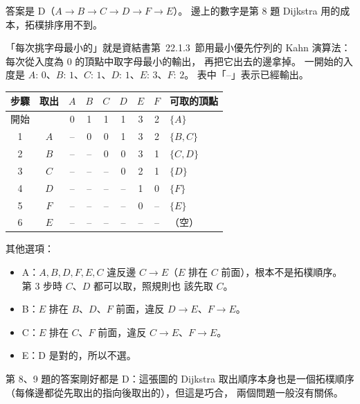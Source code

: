 \begin{pastsoln}
答案是 D（$A \to B \to C \to D \to F \to E$）。 邊上的數字是第 8 題 Dijkstra 用的成本，拓樸排序用不到。

「每次挑字母最小的」就是資結書第~22.1.3~節用最小優先佇列的 Kahn 演算法：每次從入度為 $0$ 的頂點中取字母最小的輸出，
再把它出去的邊拿掉。 一開始的入度是 $A{:}\,0$、$B{:}\,1$、$C{:}\,1$、$D{:}\,1$、$E{:}\,3$、$F{:}\,2$。 表中「--」表示已經輸出。
\begin{center}
\small
\begin{tabular}{cc*{6}{c}l}
\toprule
步驟 & 取出 & $A$ & $B$ & $C$ & $D$ & $E$ & $F$ & 可取的頂點 \\
\midrule
開始 & & 0 & 1 & 1 & 1 & 3 & 2 & $\{A\}$ \\
1 & $A$ & -- & 0 & 0 & 1 & 3 & 2 & $\{B, C\}$ \\
2 & $B$ & -- & -- & 0 & 0 & 3 & 1 & $\{C, D\}$ \\
3 & $C$ & -- & -- & -- & 0 & 2 & 1 & $\{D\}$ \\
4 & $D$ & -- & -- & -- & -- & 1 & 0 & $\{F\}$ \\
5 & $F$ & -- & -- & -- & -- & 0 & -- & $\{E\}$ \\
6 & $E$ & -- & -- & -- & -- & -- & -- & （空） \\
\bottomrule
\end{tabular}
\end{center}

其他選項：
\begin{itemize}
\item A：$A, B, D, F, E, C$ 違反邊 $C \to E$（$E$ 排在 $C$ 前面），根本不是拓樸順序。 第 3 步時 $C$、$D$ 都可以取，照規則也
該先取 $C$。
\item B：$E$ 排在 $B$、$D$、$F$ 前面，違反 $D \to E$、$F \to E$。
\item C：$E$ 排在 $C$、$F$ 前面，違反 $C \to E$、$F \to E$。
\item E：D 是對的，所以不選。
\end{itemize}
第 8、9 題的答案剛好都是 D：這張圖的 Dijkstra 取出順序本身也是一個拓樸順序（每條邊都從先取出的指向後取出的），但這是巧合，
兩個問題一般沒有關係。
\end{pastsoln}
